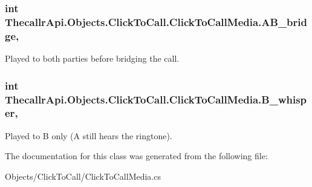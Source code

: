 \hypertarget{class_thecallr_api_1_1_objects_1_1_click_to_call_1_1_click_to_call_media_a0ad99a629b6b99d92744ccb3cbe19349}{
\subsubsection[{A\+B\+\_\+bridge}]{\setlength{\rightskip}{0pt plus 5cm}int Thecallr\+Api.\+Objects.\+Click\+To\+Call.\+Click\+To\+Call\+Media.\+A\+B\+\_\+bridge\hspace{0.3cm}{\ttfamily [get]}, {\ttfamily [set]}}}\label{class_thecallr_api_1_1_objects_1_1_click_to_call_1_1_click_to_call_media_a0ad99a629b6b99d92744ccb3cbe19349}


Played to both parties before bridging the call. 

\hypertarget{class_thecallr_api_1_1_objects_1_1_click_to_call_1_1_click_to_call_media_a25ffb7b43ae4ca4072abc0cf931b0fdb}{
\subsubsection[{B\+\_\+whisper}]{\setlength{\rightskip}{0pt plus 5cm}int Thecallr\+Api.\+Objects.\+Click\+To\+Call.\+Click\+To\+Call\+Media.\+B\+\_\+whisper\hspace{0.3cm}{\ttfamily [get]}, {\ttfamily [set]}}}\label{class_thecallr_api_1_1_objects_1_1_click_to_call_1_1_click_to_call_media_a25ffb7b43ae4ca4072abc0cf931b0fdb}


Played to B only (A still hears the ringtone). 



The documentation for this class was generated from the following file\+:\begin{DoxyCompactItemize}
\item 
Objects/\+Click\+To\+Call/Click\+To\+Call\+Media.\+cs\end{DoxyCompactItemize}
